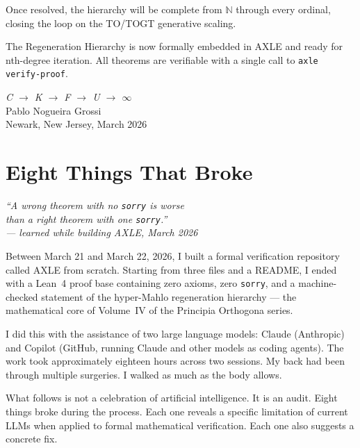 \documentclass[19pt]{book}
\theoremstyle{plain}
\theoremstyle{definition}
\theoremstyle{remark}
\begin{document}
Once resolved, the hierarchy will be complete from \(\mathbb{N}\) through every ordinal, closing the loop on the TO/TOGT generative scaling.

The Regeneration Hierarchy is now formally embedded in AXLE and ready for nth-degree iteration. All theorems are verifiable with a single call to \texttt{axle verify-proof}.
\bigskip
\begin{flushright}
\textit{C \;$\to$\; K \;$\to$\; F \;$\to$\; U \;$\to$\; $\infty$}\\[0.3em]
Pablo Nogueira Grossi\\
Newark, New Jersey, March 2026
\end{flushright}

\chapter{Eight Things That Broke}
\label{ch:eight-things}

\begin{center}
\itshape
``A wrong theorem with no \texttt{sorry} is worse\\
than a right theorem with one \texttt{sorry}.''\\[0.5em]
\normalfont\small --- learned while building AXLE, March 2026
\end{center}

\vspace{0.5cm}

\noindent Between March 21 and March 22, 2026, I built a formal
verification repository called AXLE from scratch. Starting from
three files and a README, I ended with a Lean~4 proof base containing
zero axioms, zero \texttt{sorry}, and a machine-checked statement
of the hyper-Mahlo regeneration hierarchy — the mathematical core
of Volume~IV of the Principia Orthogona series.

I did this with the assistance of two large language models: Claude
(Anthropic) and Copilot (GitHub, running Claude and other models
as coding agents). The work took approximately eighteen hours across
two sessions. My back had been through multiple surgeries. I walked
as much as the body allows.

What follows is not a celebration of artificial intelligence. It is
an audit. Eight things broke during the process. Each one reveals
a specific limitation of current LLMs when applied to formal
mathematical verification. Each one also suggests a concrete fix.
\end{document}
